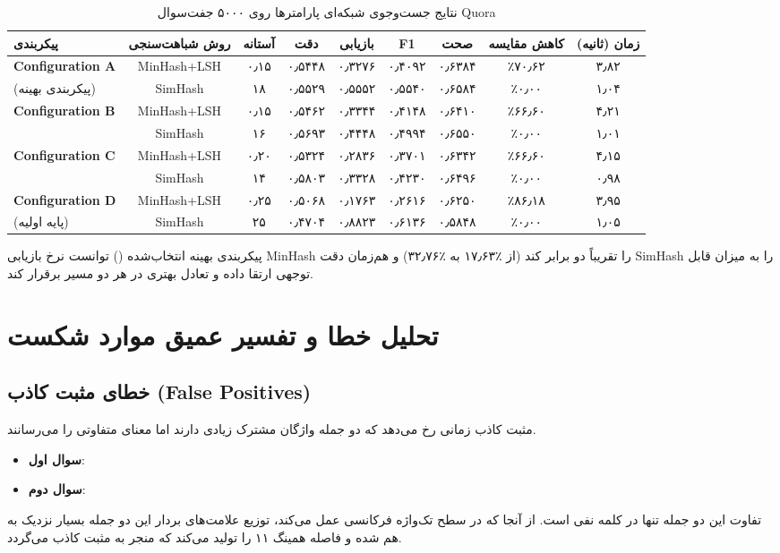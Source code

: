 \documentclass[12pt,onecolumn,a4paper]{article}
\begin{document}
\begin{table}[H]
\centering
\caption{نتایج جست‌وجوی شبکه‌ای پارامترها روی ۵۰۰۰ جفت‌سوال Quora}
\label{tab:grid}
\footnotesize
\begin{tabular}{lcccccccc}
\toprule
پیکربندی & روش شباهت‌سنجی & آستانه & دقت & بازیابی & F1 & صحت & کاهش مقایسه & زمان (ثانیه) \\
\midrule
\textbf{Configuration A} & MinHash+LSH & ۰٫۱۵ & ۰٫۵۴۴۸ & ۰٫۳۲۷۶ & ۰٫۴۰۹۲ & ۰٫۶۳۸۴ & ٪۷۰٫۶۲ & ۳٫۸۲ \\
(پیکربندی بهینه) & SimHash & ۱۸ & ۰٫۵۵۲۹ & ۰٫۵۵۵۲ & ۰٫۵۵۴۰ & ۰٫۶۵۸۴ & ٪۰٫۰۰ & ۱٫۰۴ \\
\midrule
\textbf{Configuration B} & MinHash+LSH & ۰٫۱۵ & ۰٫۵۴۶۲ & ۰٫۳۳۴۴ & ۰٫۴۱۴۸ & ۰٫۶۴۱۰ & ٪۶۶٫۶۰ & ۴٫۲۱ \\
& SimHash & ۱۶ & ۰٫۵۶۹۳ & ۰٫۴۴۴۸ & ۰٫۴۹۹۴ & ۰٫۶۵۵۰ & ٪۰٫۰۰ & ۱٫۰۱ \\
\midrule
\textbf{Configuration C} & MinHash+LSH & ۰٫۲۰ & ۰٫۵۳۲۴ & ۰٫۲۸۳۶ & ۰٫۳۷۰۱ & ۰٫۶۳۴۲ & ٪۶۶٫۶۰ & ۴٫۱۵ \\
& SimHash & ۱۴ & ۰٫۵۸۰۳ & ۰٫۳۳۲۸ & ۰٫۴۲۳۰ & ۰٫۶۴۹۶ & ٪۰٫۰۰ & ۰٫۹۸ \\
\midrule
\textbf{Configuration D} & MinHash+LSH & ۰٫۲۵ & ۰٫۵۰۶۸ & ۰٫۱۷۶۳ & ۰٫۲۶۱۶ & ۰٫۶۲۵۰ & ٪۸۶٫۱۸ & ۳٫۹۵ \\
(پایه اولیه) & SimHash & ۲۵ & ۰٫۴۷۰۴ & ۰٫۸۸۲۳ & ۰٫۶۱۳۶ & ۰٫۵۸۴۸ & ٪۰٫۰۰ & ۱٫۰۵ \\
\bottomrule
\end{tabular}
\end{table}

\begin{takeawaybox}
پیکربندی بهینه انتخاب‌شده () توانست نرخ بازیابی MinHash را تقریباً دو برابر کند (از ٪۱۷٫۶۳ به ٪۳۲٫۷۶) و هم‌زمان دقت SimHash را به میزان قابل توجهی ارتقا داده و تعادل بهتری در هر دو مسیر برقرار کند.
\end{takeawaybox}

\section{تحلیل خطا و تفسیر عمیق موارد شکست}

\subsection{خطای مثبت کاذب (False Positives)}
مثبت کاذب زمانی رخ می‌دهد که دو جمله واژگان مشترک زیادی دارند اما معنای متفاوتی را می‌رسانند.
\begin{itemize}
\item \textbf{سوال اول}: 
\item \textbf{سوال دوم}: 
\end{itemize}
تفاوت این دو جمله تنها در کلمه نفی  است. از آنجا که  در سطح تک‌واژه فرکانسی عمل می‌کند، توزیع علامت‌های بردار این دو جمله بسیار نزدیک به هم شده و فاصله همینگ ۱۱ را تولید می‌کند که منجر به مثبت کاذب می‌گردد.
\end{document}
